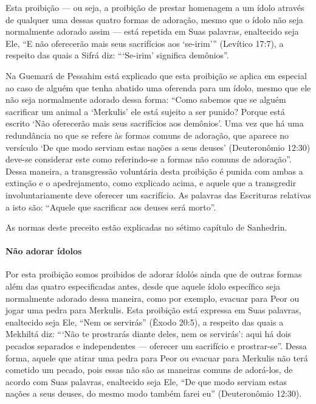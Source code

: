 Esta proibição --- ou seja, a proibição de prestar homenagem a um ídolo
através de qualquer uma dessas quatro formas de adoração, mesmo que o
ídolo não seja normalmente adorado assim --- está repetida em Suas
palavras, enaltecido seja Ele, ``E não oferecerão mais seus sacrifícios
aos `se-irim''' (Levítico 17:7), a respeito das quais a Sifrá diz:
```Se-irim' significa demônios''.

Na Guemará de Pessahim está explicado que esta proibição se aplica em
especial ao caso de alguém que tenha abatido uma oferenda para um ídolo,
mesmo que ele não seja normalmente adorado dessa forma: ``Como sabemos
que se alguém sacrificar um animal a `Merkulis' ele está sujeito a ser
punido? Porque está escrito `Não oferecerão mais seus sacrifícios aos
demônios'. Uma vez que há uma redundância no que se refere às formas
comuns de adoração, que aparece no versículo `De que modo serviam estas
nações a seus deuses' (Deuteronômio 12:30) deve-se considerar este como
referindo-se a formas não comuns de adoração''. Dessa maneira, a
transgressão voluntária desta proibição é punida com ambas a extinção e
o apedrejamento, como explicado acima, e aquele que a transgredir
involuntariamente deve oferecer um sacrifício. As palavras das
Escrituras relativas a isto são: ``Aquele que sacrificar aos deuses será
morto''.

As normas deste preceito estão explicadas no sétimo capítulo de Sanhedrin.

\paragraph{Não adorar ídolos}

Por esta proibição somos proibidos de adorar ídolós ainda que de outras
formas além das quatro especificadas antes, desde que aquele ídolo
específico seja normalmente adorado dessa maneira, como por exemplo,
evacuar para Peor ou jogar uma pedra para Merkulis. Esta proibição está
expressa em Suas palavras, enaltecido seja Ele, ``Nem os servirás''
(Êxodo 20:5), a respeito das quais a Mekhiltá diz: ```Não te prostrarás
diante deles, nem os servirás': aqui há dois pecados separados e
independentes --- oferecer um sacrifício e prostrar-se''. Dessa forma,
aquele que atirar uma pedra para Peor ou evacuar para Merkulis não terá cometido um pecado, pois essas não são as maneiras comuns
de adorá-los, de acordo com Suas palavras, enaltecido seja Ele, ``De que
modo serviam estas nações a seus deuses, do mesmo modo também farei eu''
(Deuteronômio 12:30).

